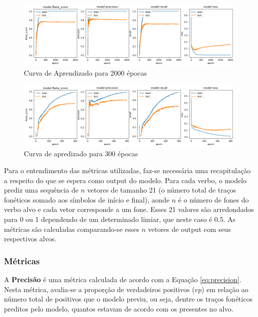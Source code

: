 \begin{figure}[H]
  \centering
  \includegraphics[width=1.0\linewidth]{img/2000_precision.png}
  \caption{Curva de Aprendizado para 2000 épocas}
  \label{fig:training2000}
\end{figure}

\begin{figure}[H]
  \centering
  \includegraphics[width=1.0\linewidth]{img/300_fbeta.png}
  \caption{Curva de apredizado para 300 épocas}
  \label{fig:training}
\end{figure}

Para o entendimento das métricas utilizadas, faz-se necessária uma recapitulação a respeito do que se espera como output do modelo. Para cada verbo, o modelo prediz uma sequência de $n$ vetores de tamanho 21 (o número total de traços fonéticos somado aos símbolos de início e final), aonde $n$ é o número de fones do verbo alvo e cada vetor corresponde a um fone. Esses 21 valores são arredondados para 0 ou 1 dependendo de um determinado limiar, que neste caso é 0.5. As métricas são calculadas comparando-se esses $n$ vetores de output com seus respectivos alvos.

\subsubsection{Métricas}

A \textbf{Precisão} é uma métrica calculada de acordo com a Equação \ref{eq:precision}. Nesta métrica, avalia-se a proporção de verdadeiros positivos ($vp$) em relação ao número total de positivos que o modelo previu, ou seja, dentre os traços fonéticos preditos pelo modelo, quantos estavam de acordo com os presentes no alvo.


